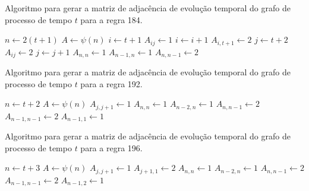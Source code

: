\documentclass[12pt,a4paper]{article}
\begin{document}
\begin{algorithm}[H]
\caption{Algoritmo para gerar a matriz de adjacência de evolução temporal do
grafo de processo de tempo $t$ para a regra 184.}
\label{alg:r184}
\begin{algorithmic}
\STATE $n \leftarrow 2(t+1)$
\STATE $A \leftarrow \psi(n)$
\STATE $i \leftarrow t+1$
    \STATE $A_{ij} \leftarrow 1$
    \STATE $i \leftarrow i+1$
\ENDFOR
{}
    \STATE $A_{i,t+1} \leftarrow 2$
\ENDFOR
\STATE $j \leftarrow t+2$
    \STATE $A_{ij} \leftarrow 2$
    \STATE $j \leftarrow j+1$
\ENDFOR
\STATE $A_{n,n} \leftarrow 1$
\STATE $A_{n-1,n} \leftarrow 1$
\STATE $A_{n,n-1} \leftarrow 2$
\end{algorithmic}
\end{algorithm}

\begin{algorithm}[H]
\caption{Algoritmo para gerar a matriz de adjacência de evolução temporal do
grafo de processo de tempo $t$ para a regra 192.}
\label{alg:r192}
\begin{algorithmic}
\STATE $n \leftarrow t+2$
\STATE $A \leftarrow \psi(n)$
    \STATE $A_{j,j+1} \leftarrow 1$
\ENDFOR
\STATE $A_{n,n} \leftarrow 1$
\STATE $A_{n-2,n} \leftarrow 1$
\STATE $A_{n,n-1} \leftarrow 2$
\STATE $A_{n-1,n-1} \leftarrow 2$
\STATE $A_{n-1,1} \leftarrow 1$
\end{algorithmic}
\end{algorithm}

\begin{algorithm}[H]
\caption{Algoritmo para gerar a matriz de adjacência de evolução temporal do
grafo de processo de tempo $t$ para a regra 196.}
\label{alg:r196}
\begin{algorithmic}
\STATE $n \leftarrow t+3$
\STATE $A \leftarrow \psi(n)$
    \STATE $A_{j,j+1} \leftarrow 1$
    \STATE $A_{j+1,1} \leftarrow 2$
\ENDFOR
\STATE $A_{n,n} \leftarrow 1$
\STATE $A_{n-2,n} \leftarrow 1$
\STATE $A_{n,n-1} \leftarrow 2$
\STATE $A_{n-1,n-1} \leftarrow 2$
\STATE $A_{n-1,2} \leftarrow 1$
\end{algorithmic}
\end{algorithm}
\end{document}
